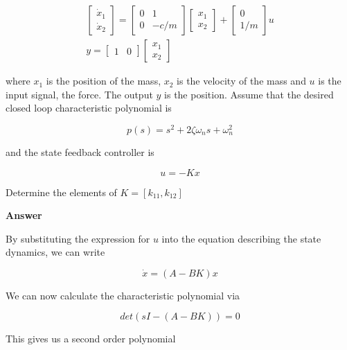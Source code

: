 \begin{eqnarray}
\begin{bmatrix}
 \dot{x}_1 \\
 \dot{x}_2 
\end{bmatrix} =  
\begin{bmatrix}
 0 & 1 \\
 0 & -c/m
\end{bmatrix}
\begin{bmatrix}
 x_1 \\
 x_2  
\end{bmatrix}+
\begin{bmatrix}
 0 \\
 1/m  
\end{bmatrix}u \\
y =
\begin{bmatrix}
 1 & 0 
\end{bmatrix}
\begin{bmatrix}
 x_1 \\
 x_2  
\end{bmatrix}
\end{eqnarray}

where $x_1$ is the position of the mass, $x_2$ is the velocity of the mass and $u$ is the input signal, the force. The output $y$ is the position. Assume that the desired closed loop characteristic polynomial is

\begin{equation}
p(s) = s^2 + 2\zeta \omega_n s +\omega_{n}^{2}  
\end{equation}

and the state feedback controller is 

\begin{equation}
u = -Kx  
\end{equation}

Determine the elements of $K=[k_{11}, k_{12}]$

\textbf{Answer}

By substituting the expression for $u$ into the equation describing the state dynamics, we can write

\begin{equation}
\dot{x} = (A - BK)x
\end{equation}

We can now calculate the characteristic polynomial via


\begin{equation}
det(s I - (A - BK)) = 0
\end{equation}

This gives us a second order polynomial

